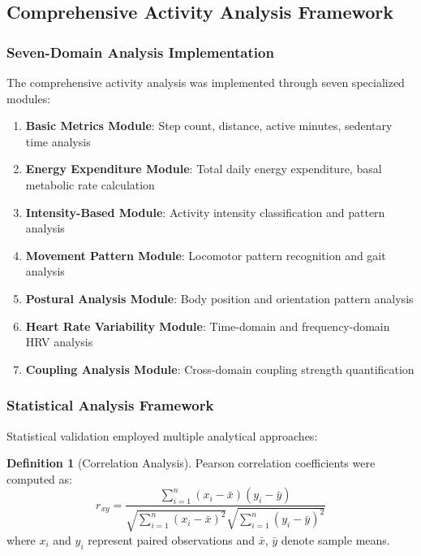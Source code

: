 \documentclass[12pt,a4paper]{article}
\theoremstyle{definition}
\newtheorem{definition}{Definition}[section]
\begin{document}
\subsection{Comprehensive Activity Analysis Framework}

\subsubsection{Seven-Domain Analysis Implementation}

The comprehensive activity analysis was implemented through seven specialized modules:

\begin{enumerate}
\item \textbf{Basic Metrics Module}: Step count, distance, active minutes, sedentary time analysis
\item \textbf{Energy Expenditure Module}: Total daily energy expenditure, basal metabolic rate calculation
\item \textbf{Intensity-Based Module}: Activity intensity classification and pattern analysis
\item \textbf{Movement Pattern Module}: Locomotor pattern recognition and gait analysis
\item \textbf{Postural Analysis Module}: Body position and orientation pattern analysis
\item \textbf{Heart Rate Variability Module}: Time-domain and frequency-domain HRV analysis
\item \textbf{Coupling Analysis Module}: Cross-domain coupling strength quantification
\end{enumerate}

\subsubsection{Statistical Analysis Framework}

Statistical validation employed multiple analytical approaches:

\begin{definition}[Correlation Analysis]
Pearson correlation coefficients were computed as:
\begin{equation}
r_{xy} = \frac{\sum_{i=1}^{n}(x_i - \bar{x})(y_i - \bar{y})}{\sqrt{\sum_{i=1}^{n}(x_i - \bar{x})^2}\sqrt{\sum_{i=1}^{n}(y_i - \bar{y})^2}}
\end{equation}
where $x_i$ and $y_i$ represent paired observations and $\bar{x}$, $\bar{y}$ denote sample means.
\end{definition}
\end{document}
